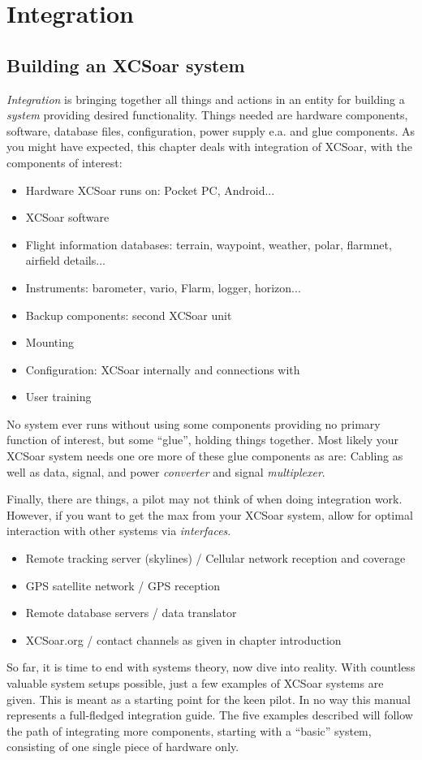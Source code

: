 \chapter{Integration}\label{cha:Integration}

\section{Building an XCSoar system}
\emph{Integration} is bringing together all things and actions in an entity for  
building a \emph{system} providing desired functionality. Things needed are 
hardware components, software, database files, configuration, power supply e.a. 
and glue components. As you might have expected, this chapter deals with 
integration of XCSoar, with the components of interest:
\begin{itemize} 
\item Hardware XCSoar runs on: Pocket PC, Android...
\item XCSoar software
\item Flight information databases: terrain, waypoint, weather, polar, 
flarmnet, airfield details...
\item Instruments: barometer, vario, Flarm, logger, horizon...
\item Backup components: second XCSoar unit
\item Mounting
\item Configuration: XCSoar internally and connections with
\item User training
\end{itemize}
No system ever runs without using some components providing no primary function 
of interest, but some ``glue'', holding things together.  Most likely your XCSoar
system needs one ore more of these glue components as are:
Cabling as well as data, signal, and power \emph{converter} and signal 
\emph{multiplexer}.

Finally, there are things, a pilot may not think of when doing integration work. 
However, if you want to get the max from your XCSoar system, allow for optimal 
interaction with other systems via \emph{interfaces}.
\begin{itemize}
\item Remote tracking server (skylines) / Cellular network reception and coverage
\item GPS satellite network / GPS reception
\item Remote database servers / data translator
\item XCSoar.org / contact channels as given in chapter introduction
\end{itemize}
So far, it is time to end with systems theory, now dive into reality. With 
countless valuable system setups possible, just a few examples of XCSoar systems 
are given. This is meant as a starting point for the 
keen pilot. In no way this manual represents a full-fledged integration guide.  
The five examples described will follow the path of integrating more components, 
starting with a ``basic'' system, consisting of one single piece of hardware only.

